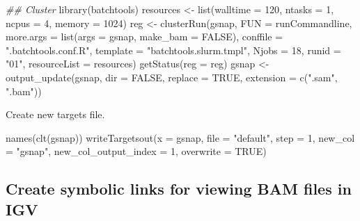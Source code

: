 \documentclass[14pt,]{article}
\newcommand{\hlnum}[1]{\textcolor[rgb]{0.816,0.125,0.439}{#1}}%
\newcommand{\hlstr}[1]{\textcolor[rgb]{0.251,0.627,0.251}{#1}}%
\newcommand{\hlcom}[1]{\textcolor[rgb]{0.502,0.502,0.502}{\textit{#1}}}%
\newcommand{\hlstd}[1]{\textcolor[rgb]{0.251,0.251,0.251}{#1}}%
\newcommand{\hlkwc}[1]{\textcolor[rgb]{0.251,0.251,0.251}{#1}}%
\newcommand{\hlkwd}[1]{\textcolor[rgb]{0.878,0.439,0.125}{#1}}%
\newenvironment{Shaded}{\begin{myshaded}}{\end{myshaded}}
\newcommand{\KeywordTok}[1]{\hlkwd{#1}}
\newcommand{\DataTypeTok}[1]{\hlkwc{#1}}
\newcommand{\DecValTok}[1]{\hlnum{#1}}
\newcommand{\StringTok}[1]{\hlstr{#1}}
\newcommand{\CommentTok}[1]{\hlcom{#1}}
\newcommand{\OtherTok}[1]{{#1}}
\newcommand{\NormalTok}[1]{\hlstd{#1}}
\begin{document}
\begin{Shaded}
\begin{Highlighting}[]
\CommentTok{## Cluster}
\KeywordTok{library}\NormalTok{(batchtools)}
\NormalTok{resources <-}\StringTok{ }\KeywordTok{list}\NormalTok{(}\DataTypeTok{walltime =} \DecValTok{120}\NormalTok{, }\DataTypeTok{ntasks =} \DecValTok{1}\NormalTok{, }\DataTypeTok{ncpus =} \DecValTok{4}\NormalTok{, }\DataTypeTok{memory =} \DecValTok{1024}\NormalTok{)}
\NormalTok{reg <-}\StringTok{ }\KeywordTok{clusterRun}\NormalTok{(gsnap, }\DataTypeTok{FUN =}\NormalTok{ runCommandline, }\DataTypeTok{more.args =} \KeywordTok{list}\NormalTok{(}\DataTypeTok{args =}\NormalTok{ gsnap, }\DataTypeTok{make_bam =} \OtherTok{FALSE}\NormalTok{), }
    \DataTypeTok{conffile =} \StringTok{".batchtools.conf.R"}\NormalTok{, }\DataTypeTok{template =} \StringTok{"batchtools.slurm.tmpl"}\NormalTok{, }\DataTypeTok{Njobs =} \DecValTok{18}\NormalTok{, }
    \DataTypeTok{runid =} \StringTok{"01"}\NormalTok{, }\DataTypeTok{resourceList =}\NormalTok{ resources)}
\KeywordTok{getStatus}\NormalTok{(}\DataTypeTok{reg =}\NormalTok{ reg)}
\NormalTok{gsnap <-}\StringTok{ }\KeywordTok{output_update}\NormalTok{(gsnap, }\DataTypeTok{dir =} \OtherTok{FALSE}\NormalTok{, }\DataTypeTok{replace =} \OtherTok{TRUE}\NormalTok{, }\DataTypeTok{extension =} \KeywordTok{c}\NormalTok{(}\StringTok{".sam"}\NormalTok{, }
    \StringTok{".bam"}\NormalTok{))}
\end{Highlighting}
\end{Shaded}

Create new targets file.

\begin{Shaded}
\begin{Highlighting}[]
\KeywordTok{names}\NormalTok{(}\KeywordTok{clt}\NormalTok{(gsnap))}
\KeywordTok{writeTargetsout}\NormalTok{(}\DataTypeTok{x =}\NormalTok{ gsnap, }\DataTypeTok{file =} \StringTok{"default"}\NormalTok{, }\DataTypeTok{step =} \DecValTok{1}\NormalTok{, }\DataTypeTok{new_col =} \StringTok{"gsnap"}\NormalTok{, }\DataTypeTok{new_col_output_index =} \DecValTok{1}\NormalTok{, }
    \DataTypeTok{overwrite =} \OtherTok{TRUE}\NormalTok{)}
\end{Highlighting}
\end{Shaded}

\hypertarget{create-symbolic-links-for-viewing-bam-files-in-igv}{%
\subsection{Create symbolic links for viewing BAM files in IGV}\label{create-symbolic-links-for-viewing-bam-files-in-igv}}
\end{document}
